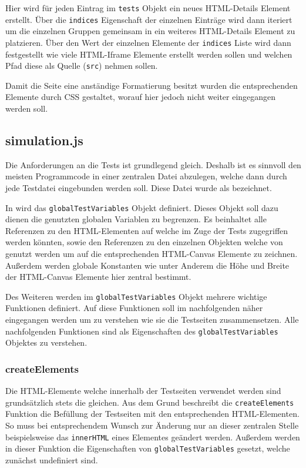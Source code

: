 Hier wird für jeden Eintrag im \lstinline{tests} Objekt ein neues HTML-Details Element erstellt. %
Über die \lstinline{indices} Eigenschaft der einzelnen Einträge wird dann iteriert um die einzelnen Gruppen gemeinsam in ein weiteres HTML-Details Element zu platzieren.
Über den Wert der einzelnen Elemente der \lstinline{indices} Liste wird dann festgestellt wie viele HTML-Iframe Elemente erstellt werden sollen und welchen Pfad diese als Quelle (\lstinline{src}) nehmen sollen.

Damit die Seite eine anständige Formatierung besitzt wurden die entsprechenden Elemente durch CSS gestaltet, worauf hier jedoch nicht weiter eingegangen werden soll.

\subsection{simulation.js}\label{ch:simulation_js}

Die Anforderungen an die Tests ist grundlegend gleich.
Deshalb ist es sinnvoll den meisten Programmcode in einer zentralen Datei abzulegen, welche dann durch jede Testdatei eingebunden werden soll.
Diese Datei wurde als  bezeichnet.

In  wird das \lstinline{globalTestVariables} Objekt definiert.
Dieses Objekt soll dazu dienen die genutzten globalen Variablen zu begrenzen.
Es beinhaltet alle Referenzen zu den HTML-Elementen auf welche im Zuge der Tests zugegriffen werden könnten, sowie den Referenzen zu den einzelnen  Objekten welche von  genutzt werden um auf die entsprechenden HTML-Canvas Elemente zu zeichnen.
Außerdem werden globale Konstanten wie unter Anderem die Höhe und Breite der HTML-Canvas Elemente hier zentral bestimmt.

Des Weiteren werden im \lstinline{globalTestVariables} Objekt mehrere wichtige Funktionen definiert.
Auf diese Funktionen soll im nachfolgenden näher eingegangen werden um zu verstehen wie sie die Testseiten zusammensetzen.
Alle nachfolgenden Funktionen sind als Eigenschaften des \lstinline{globalTestVariables} Objektes zu verstehen.

\subsubsection{createElements}\label{ch:gtv_createElements}

Die HTML-Elemente welche innerhalb der Testseiten verwendet werden sind grundsätzlich stets die gleichen.
Aus dem Grund beschreibt die \lstinline{createElements} Funktion die Befüllung der Testseiten mit den entsprechenden HTML-Elementen.
So muss bei entsprechendem Wunsch zur Änderung nur an dieser zentralen Stelle beispielsweise das \lstinline{innerHTML} eines Elementes geändert werden.
Außerdem werden in dieser Funktion die Eigenschaften von \lstinline{globalTestVariables} gesetzt, welche zunächst undefiniert sind.

